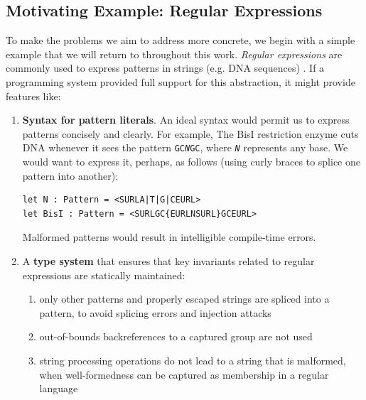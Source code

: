 \subsection{Motivating Example: Regular Expressions}\label{regex}
To make the problems we aim to address more concrete, we begin with a simple example that we will return to throughout this work. \emph{Regular expressions} are commonly used to express patterns in strings (e.g. DNA sequences) \cite{Thompson:1968:PTR:363347.363387}. If a programming system provided full support for this abstraction, it might  provide features like:

\begin{enumerate}
\item \textbf{Syntax for pattern literals}. An ideal syntax would permit us to express patterns concisely and clearly. For example, The BisI restriction enzyme cuts DNA whenever it sees the pattern \texttt{GC\textit{N}GC}, where \texttt{\textit{N}} represents any base. We would want to express it, perhaps, as follows (using curly braces to splice one pattern into another):
\begin{lstlisting}[numbers=none]
let N : Pattern = <SURLA|T|G|CEURL>
let BisI : Pattern = <SURLGC{EURLNSURL}GCEURL>\end{lstlisting}
Malformed patterns would result in intelligible {compile-time} errors.
\item A \textbf{type system} that ensures that key invariants related to regular expressions are statically maintained:
	\begin{enumerate}
	\item only other patterns and properly escaped strings are spliced into a pattern, to avoid splicing errors and injection attacks \cite{owasp2013, Bravenboer:2007:PIA:1289971.1289975}
	\item out-of-bounds backreferences to a captured group are not used \cite{spishak2012type}
	\item string processing operations do not lead to a string that is malformed, when well-formedness can be captured as membership in a regular language \cite{fulton-thesis}
	\end{enumerate}

\end{enumerate}
